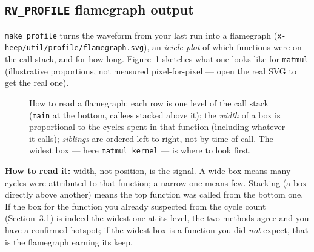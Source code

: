 \documentclass[11pt]{article}
\newcommand{\code}[1]{\texttt{#1}}
\begin{document}
\subsection{\code{RV\_PROFILE} flamegraph output}

\code{make profile} turns the waveform from your last run into a flamegraph
(\code{x-heep/util/profile/flamegraph.svg}), an \emph{icicle plot} of which
functions were on the call stack, and for how long. Figure~\ref{fig:flame}
sketches what one looks like for \code{matmul} (illustrative proportions, not
measured pixel-for-pixel --- open the real SVG to get the real one).

\begin{figure}[h]
\centering
{}
\caption{How to read a flamegraph: each row is one level of the call stack
(\code{main} at the bottom, callees stacked above it); the \emph{width} of a
box is proportional to the cycles spent in that function (including
whatever it calls); \emph{siblings} are ordered left-to-right, not by time of
call. The widest box --- here \code{matmul\_kernel} --- is where to look
first.}
\label{fig:flame}
\end{figure}

\textbf{How to read it:} width, not position, is the signal. A wide box
means many cycles were attributed to that function; a narrow one means few.
Stacking (a box directly above another) means the top function was called
from the bottom one. If the box for the function you already suspected from
the cycle count (Section~3.1) is indeed the widest one at its level, the two
methods agree and you have a confirmed hotspot; if the widest box is a
function you did \emph{not} expect, that is the flamegraph earning its keep.
\end{document}

